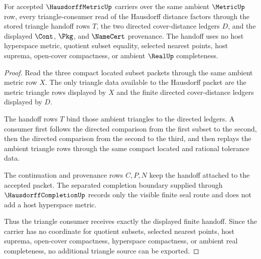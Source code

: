 \begin{theorem}
\label{thm:hausdorff-metric-triangle-handoff}
For accepted $\HausdorffMetricUp$ carriers over the same ambient $\MetricUp$ row, every triangle-consumer read of the Hausdorff distance factors through the stored triangle handoff rows $T$, the two directed cover-distance ledgers $D$, and the displayed $\Cont$, $\Pkg$, and $\NameCert$ provenance. The handoff uses no host hyperspace metric, quotient subset equality, selected nearest points, host suprema, open-cover compactness, or ambient $\RealUp$ completeness.
\end{theorem}
\begin{proof}
Read the three compact located subset packets through the same ambient metric row $X$. The only triangle data available to the Hausdorff packet are the metric triangle rows displayed by $X$ and the finite directed cover-distance ledgers displayed by $D$.

The handoff rows $T$ bind those ambient triangles to the directed ledgers. A consumer first follows the directed comparison from the first subset to the second, then the directed comparison from the second to the third, and then replays the ambient triangle rows through the same compact located and rational tolerance data.

The continuation and provenance rows $C,P,N$ keep the handoff attached to the accepted packet. The separated completion boundary supplied through $\HausdorffCompletionUp$ records only the visible finite seal route and does not add a host hyperspace metric.

Thus the triangle consumer receives exactly the displayed finite handoff. Since the carrier has no coordinate for quotient subsets, selected nearest points, host suprema, open-cover compactness, hyperspace compactness, or ambient real completeness, no additional triangle source can be exported.
\end{proof}



